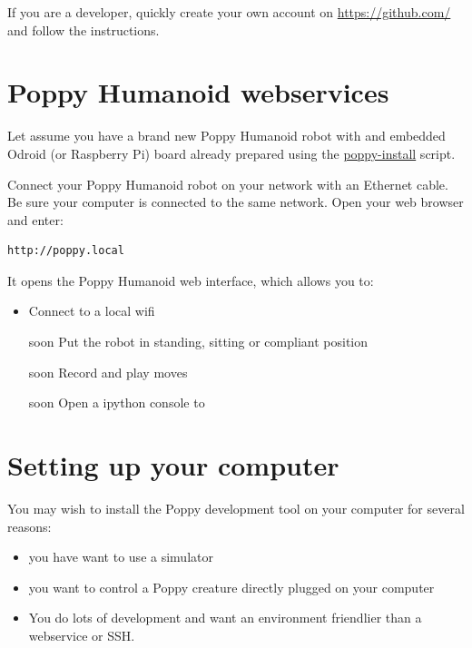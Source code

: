 \documentclass{article}
\begin{document}
If you are a developer, quickly create your own account on \url{https://github.com/} and follow the instructions.



\section{Poppy Humanoid webservices}
\label{poppy-webservices}

Let assume you have a brand new Poppy Humanoid robot with and embedded Odroid (or Raspberry Pi) board already prepared using the \href{https://github.com/poppy-project/poppy_install}{poppy-install} script.

Connect your Poppy Humanoid robot on your network with an Ethernet cable. Be sure your computer is connected to the same network. Open your web browser and enter:

\begin{verbatim}
http://poppy.local
\end{verbatim}

It opens the Poppy Humanoid web interface, which allows you to:

\begin{itemize}
\item Connect to a local wifi
\item [soon] Put the robot in standing, sitting or compliant position
\item [soon] Record and play moves
\item [soon] Open a ipython console to 
\end{itemize}


\section{Setting up your computer}
\label{installing-pypot}
You may wish to install the Poppy development tool on your computer for several reasons:

\begin{itemize}
\item you have want to use a simulator
\item you want to control a Poppy creature directly plugged on your computer
\item You do lots of development and want an environment friendlier than a webservice or SSH.
\end{itemize}
\end{document}
